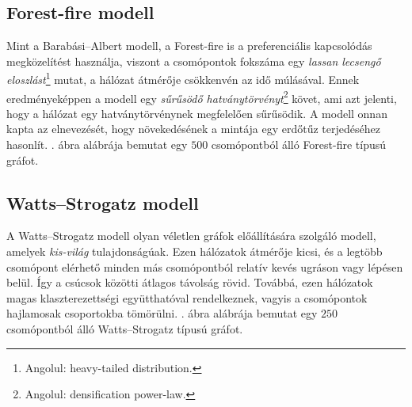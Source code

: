 \subsection{Forest-fire modell}
Mint a Barabási–Albert modell, a Forest-fire is a preferenciális kapcsolódás megközelítést használja,
viszont a csomópontok fokszáma egy \textit{lassan lecsengő eloszlást}\footnote{Angolul: heavy-tailed distribution.} mutat,
a hálózat átmérője csökkenvén az idő múlásával. Ennek eredményeképpen a modell egy \textit{sűrűsödő hatványtörvényt}\footnote{Angolul: densification power-law.} követ,
ami azt jelenti, hogy a hálózat egy hatványtörvénynek megfelelően sűrűsödik.
A modell onnan kapta az elnevezését, hogy növekedésének a mintája egy erdőtűz terjedéséhez hasonlít.
. ábra  alábrája bemutat egy $500$ csomópontból álló Forest-fire típusú gráfot.


\subsection{Watts–Strogatz modell}
A Watts–Strogatz modell olyan véletlen gráfok előállítására szolgáló modell, amelyek \textit{kis-világ} tulajdonságúak.
Ezen hálózatok átmérője kicsi, és a legtöbb csomópont elérhető minden más csomópontból relatív kevés ugráson vagy lépésen belül.
Így a csúcsok közötti átlagos távolság rövid.
Továbbá, ezen hálózatok magas klaszterezettségi együtthatóval rendelkeznek, vagyis a csomópontok hajlamosak csoportokba tömörülni.
. ábra  alábrája bemutat egy $250$ csomópontból álló Watts–Strogatz típusú gráfot.


